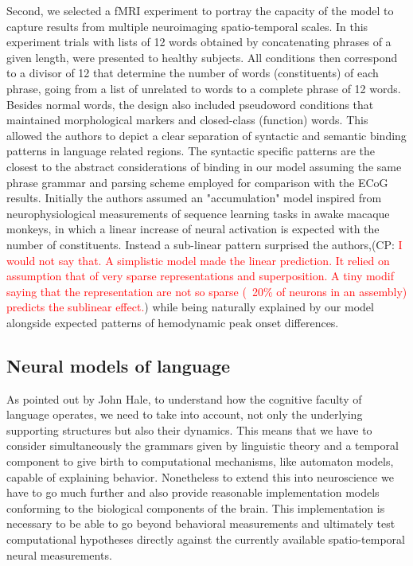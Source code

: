 \documentclass[10pt]{article}
\newcommand{\noteCP}[1]{(CP: \textcolor{red}{#1})}
\begin{document}
Second, we selected a fMRI experiment \cite{Pallier_2011} to portray the capacity of the model to capture results from multiple neuroimaging spatio-temporal scales.
In this experiment trials with lists of 12 words obtained by concatenating phrases of a given length, were presented to healthy subjects.
All conditions then correspond to a divisor of 12 that determine the number of words (constituents) of each phrase, going from a list of unrelated to words to a complete phrase of 12 words.
Besides normal words, the design also included pseudoword conditions that maintained morphological markers and closed-class (function) words.
This allowed the authors to depict a clear separation of syntactic and semantic binding patterns in language related regions.
The syntactic specific patterns are the closest to the abstract considerations of binding in our model assuming the same phrase grammar and parsing scheme employed for comparison with the ECoG results.
Initially the authors assumed an "accumulation" model inspired from neurophysiological measurements of sequence learning tasks in awake macaque monkeys, in which a linear increase of neural activation is expected with the number of constituents.
Instead a sub-linear pattern surprised the authors,\noteCP{I would not say that. A simplistic model made the linear prediction. It relied on assumption that of very sparse representations and superposition. A tiny modif saying that the representation are not so sparse (~20\% of neurons in an assembly)  predicts the sublinear effect.}  while being naturally explained by our model alongside expected patterns of hemodynamic peak onset differences.


\subsection{Neural models of language}

{\label{619233}}

As pointed out by John Hale\cite{hale2014automaton}, to understand how the cognitive faculty of language operates, we need to take into account, not only the underlying supporting structures but also their dynamics.
This means that we have to consider simultaneously the grammars given by linguistic theory and a temporal component to give birth to computational mechanisms, like automaton models, capable of explaining behavior.
Nonetheless to extend this into neuroscience we have to go much further and also provide reasonable implementation models conforming to the biological components of the brain.
This implementation is necessary to be able to go beyond behavioral measurements and ultimately test computational hypotheses directly against the currently available spatio-temporal neural measurements.
\end{document}
